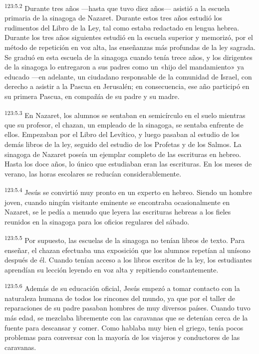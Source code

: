 \par 
\textsuperscript{123:5.2} Durante tres años ---hasta que tuvo diez años--- asistió a la escuela primaria de la sinagoga de Nazaret. Durante estos tres años estudió los rudimentos del Libro de la Ley, tal como estaba redactado en lengua hebrea. Durante los tres años siguientes estudió en la escuela superior y memorizó, por el método de repetición en voz alta, las enseñanzas más profundas de la ley sagrada. Se graduó en esta escuela de la sinagoga cuando tenía trece años, y los dirigentes de la sinagoga lo entregaron a sus padres como un «hijo del mandamiento» ya educado ---en adelante, un ciudadano responsable de la comunidad de Israel, con derecho a asistir a la Pascua en Jerusalén; en consecuencia, ese año participó en su primera Pascua, en compañía de su padre y su madre.

\par 
\textsuperscript{123:5.3} En Nazaret, los alumnos se sentaban en semicírculo en el suelo mientras que su profesor, el chazan, un empleado de la sinagoga, se sentaba enfrente de ellos. Empezaban por el Libro del Levítico, y luego pasaban al estudio de los demás libros de la ley, seguido del estudio de los Profetas y de los Salmos. La sinagoga de Nazaret poseía un ejemplar completo de las escrituras en hebreo. Hasta los doce años, lo único que estudiaban eran las escrituras. En los meses de verano, las horas escolares se reducían considerablemente.

\par 
\textsuperscript{123:5.4} Jesús se convirtió muy pronto en un experto en hebreo. Siendo un hombre joven, cuando ningún visitante eminente se encontraba ocasionalmente en Nazaret, se le pedía a menudo que leyera las escrituras hebreas a los fieles reunidos en la sinagoga para los oficios regulares del sábado.

\par 
\textsuperscript{123:5.5} Por supuesto, las escuelas de la sinagoga no tenían libros de texto. Para enseñar, el chazan efectuaba una exposición que los alumnos repetían al unísono después de él. Cuando tenían acceso a los libros escritos de la ley, los estudiantes aprendían su lección leyendo en voz alta y repitiendo constantemente.

\par 
\textsuperscript{123:5.6} Además de su educación oficial, Jesús empezó a tomar contacto con la naturaleza humana de todos los rincones del mundo, ya que por el taller de reparaciones de su padre pasaban hombres de muy diversos países. Cuando tuvo más edad, se mezclaba libremente con las caravanas que se detenían cerca de la fuente para descansar y comer. Como hablaba muy bien el griego, tenía pocos problemas para conversar con la mayoría de los viajeros y conductores de las caravanas.

